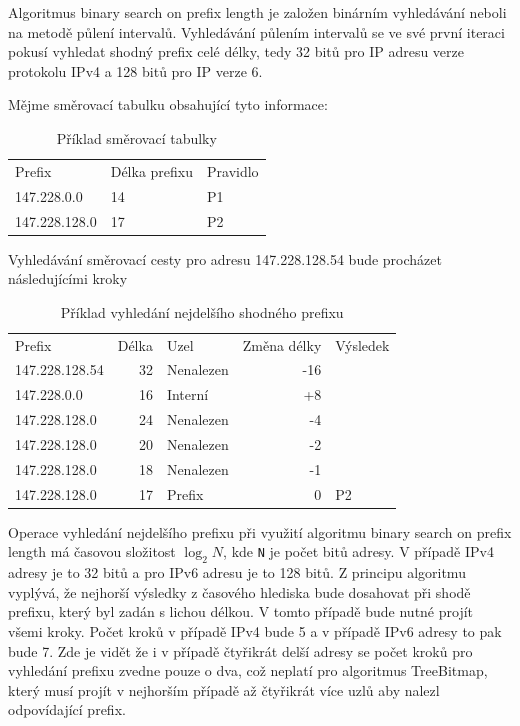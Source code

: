 Algoritmus binary search on prefix length je založen binárním vyhledávání neboli na metodě
půlení intervalů. Vyhledávání půlením intervalů
se ve své první iteraci pokusí vyhledat shodný prefix celé délky, tedy 32 bitů pro IP adresu
verze protokolu IPv4 a 128 bitů pro IP verze 6.

Mějme směrovací tabulku obsahující tyto informace:

\begin{table}[!htbp]
	\center
    \begin{tabular}{|l|l|l|}
    \hline
    Prefix        & Délka prefixu & Pravidlo \\ \hhline{|=|=|=|}
    147.228.0.0   & 14            & P1       \\ \hline
    147.228.128.0 & 17            & P2       \\ \hline
    \end{tabular}
    \caption{Příklad směrovací tabulky}
\end{table}

Vyhledávání směrovací cesty pro adresu 147.228.128.54 bude procházet následujícími kroky

\begin{table}[!htbp]
	\center
    \begin{tabular}{|l|r|l|r|l|}
    \hline
    Prefix & Délka & Uzel & Změna délky & Výsledek \\ \hhline{|=|=|=|=|=|}
    147.228.128.54 & 32 & Nenalezen & -16 &  \\ \hline
    147.228.0.0 & 16 & Interní & +8 &  \\ \hline
    147.228.128.0 & 24 & Nenalezen & -4 &  \\ \hline
    147.228.128.0 & 20 & Nenalezen & -2 &  \\ \hline
    147.228.128.0 & 18 & Nenalezen & -1 &  \\ \hline
    147.228.128.0 & 17 & Prefix & 0 & P2 \\ \hline
    \end{tabular}
    \caption{Příklad vyhledání nejdelšího shodného prefixu}
\end{table}

Operace vyhledání nejdelšího prefixu při využití algoritmu binary search on prefix length má časovou
složitost $\log_2{N}$, kde \texttt{N} je počet bitů adresy. V případě IPv4 adresy je to 32 bitů a pro IPv6
adresu je to 128 bitů. Z principu algoritmu vyplývá, že nejhorší výsledky z časového hlediska bude dosahovat
při shodě prefixu, který byl zadán s lichou délkou. V tomto případě bude nutné projít všemi kroky.
Počet kroků v případě IPv4 bude 5 a v případě IPv6 adresy to pak bude 7.
Zde je vidět že i v případě čtyřikrát delší adresy se počet kroků pro vyhledání prefixu zvedne pouze o dva,
což neplatí pro algoritmus TreeBitmap, který musí projít v nejhorším případě až čtyřikrát více
uzlů aby nalezl odpovídající prefix.
\cite{bspl}

